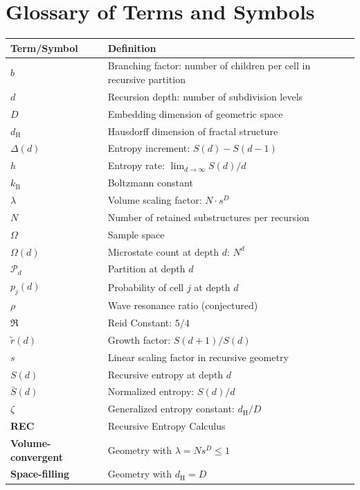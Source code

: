 \documentclass[11pt,a4paper]{article}
\theoremstyle{definition}
\theoremstyle{remark}
\newcommand{\kB}{k_{\mathrm{B}}}
\newcommand{\dH}{d_{\mathrm{H}}}
\newcommand{\Sbar}{\bar{S}}
\newcommand{\rtilde}{\tilde{r}}
\newcommand{\Partition}{\mathcal{P}}
\begin{document}
\section{Glossary of Terms and Symbols}
\label{app:glossary}

\begin{longtable}{@{}lp{10cm}@{}}
\toprule
\textbf{Term/Symbol} & \textbf{Definition} \\
\midrule
\endhead

$b$ & Branching factor: number of children per cell in recursive partition \\
$d$ & Recursion depth: number of subdivision levels \\
$D$ & Embedding dimension of geometric space \\
$\dH$ & Hausdorff dimension of fractal structure \\
$\Delta(d)$ & Entropy increment: $S(d) - S(d-1)$ \\
$h$ & Entropy rate: $\lim_{d \to \infty} S(d)/d$ \\
$\kB$ & Boltzmann constant \\
$\lambda$ & Volume scaling factor: $N \cdot s^D$ \\
$N$ & Number of retained substructures per recursion \\
$\Omega$ & Sample space \\
$\Omega(d)$ & Microstate count at depth $d$: $N^d$ \\
$\Partition_d$ & Partition at depth $d$ \\
$p_j(d)$ & Probability of cell $j$ at depth $d$ \\
$\rho$ & Wave resonance ratio (conjectured) \\
$\mathfrak{R}$ & Reid Constant: $5/4$ \\
$\rtilde(d)$ & Growth factor: $S(d+1)/S(d)$ \\
$s$ & Linear scaling factor in recursive geometry \\
$S(d)$ & Recursive entropy at depth $d$ \\
$\Sbar(d)$ & Normalized entropy: $S(d)/d$ \\
$\zeta$ & Generalized entropy constant: $\dH/D$ \\
\midrule
\textbf{REC} & Recursive Entropy Calculus \\
\textbf{Volume-convergent} & Geometry with $\lambda = Ns^D \leq 1$ \\
\textbf{Space-filling} & Geometry with $\dH = D$ \\
\bottomrule
\end{longtable}
\end{document}
